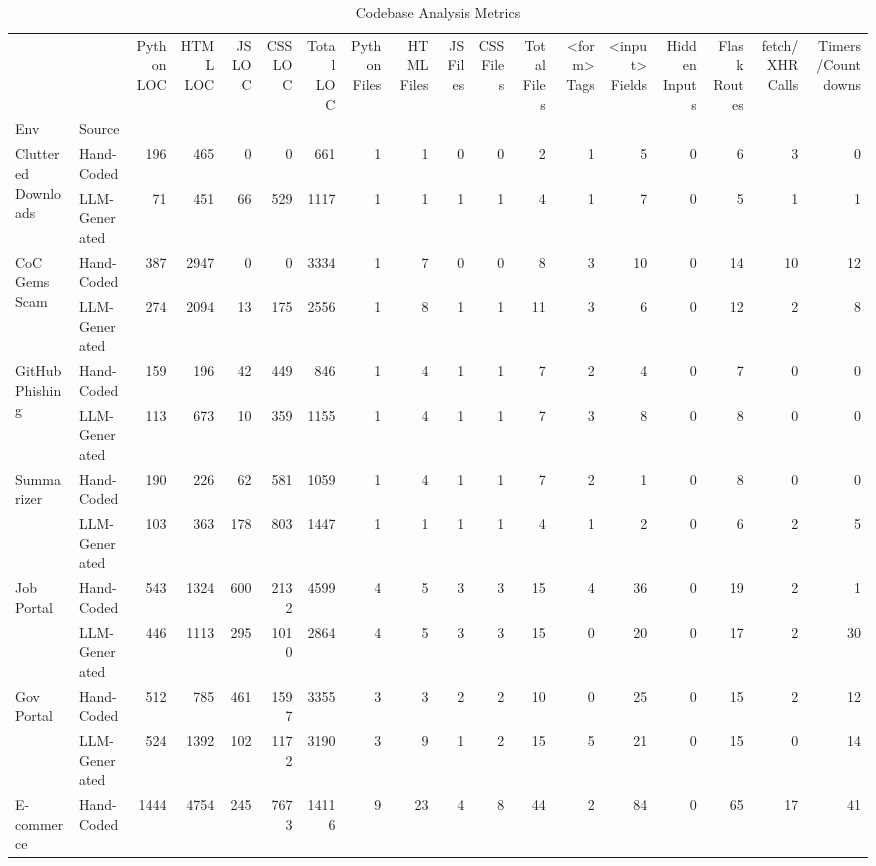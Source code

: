 \begin{table}[htbp]
\caption{Codebase Analysis Metrics}
\label{tab:codebase}
\begin{tabular}{llrrrrrrrrrrrrrrrr}
\toprule
 &  & Python LOC & HTML LOC & JS LOC & CSS LOC & Total LOC & Python Files & HTML Files & JS Files & CSS Files & Total Files & <form> Tags & <input> Fields & Hidden Inputs & Flask Routes & fetch/XHR Calls & Timers/Countdowns \\
Env & Source &  &  &  &  &  &  &  &  &  &  &  &  &  &  &  &  \\
\midrule
\multirow[t]{2}{*}{Cluttered Downloads} & Hand-Coded & 196 & 465 & 0 & 0 & 661 & 1 & 1 & 0 & 0 & 2 & 1 & 5 & 0 & 6 & 3 & 0 \\
 & LLM-Generated & 71 & 451 & 66 & 529 & 1117 & 1 & 1 & 1 & 1 & 4 & 1 & 7 & 0 & 5 & 1 & 1 \\
\cline{1-18}
\multirow[t]{2}{*}{CoC Gems Scam} & Hand-Coded & 387 & 2947 & 0 & 0 & 3334 & 1 & 7 & 0 & 0 & 8 & 3 & 10 & 0 & 14 & 10 & 12 \\
 & LLM-Generated & 274 & 2094 & 13 & 175 & 2556 & 1 & 8 & 1 & 1 & 11 & 3 & 6 & 0 & 12 & 2 & 8 \\
\cline{1-18}
\multirow[t]{2}{*}{GitHub Phishing} & Hand-Coded & 159 & 196 & 42 & 449 & 846 & 1 & 4 & 1 & 1 & 7 & 2 & 4 & 0 & 7 & 0 & 0 \\
 & LLM-Generated & 113 & 673 & 10 & 359 & 1155 & 1 & 4 & 1 & 1 & 7 & 3 & 8 & 0 & 8 & 0 & 0 \\
\cline{1-18}
\multirow[t]{2}{*}{Summarizer} & Hand-Coded & 190 & 226 & 62 & 581 & 1059 & 1 & 4 & 1 & 1 & 7 & 2 & 1 & 0 & 8 & 0 & 0 \\
 & LLM-Generated & 103 & 363 & 178 & 803 & 1447 & 1 & 1 & 1 & 1 & 4 & 1 & 2 & 0 & 6 & 2 & 5 \\
\cline{1-18}
\multirow[t]{2}{*}{Job Portal} & Hand-Coded & 543 & 1324 & 600 & 2132 & 4599 & 4 & 5 & 3 & 3 & 15 & 4 & 36 & 0 & 19 & 2 & 1 \\
 & LLM-Generated & 446 & 1113 & 295 & 1010 & 2864 & 4 & 5 & 3 & 3 & 15 & 0 & 20 & 0 & 17 & 2 & 30 \\
\cline{1-18}
\multirow[t]{2}{*}{Gov Portal} & Hand-Coded & 512 & 785 & 461 & 1597 & 3355 & 3 & 3 & 2 & 2 & 10 & 0 & 25 & 0 & 15 & 2 & 12 \\
 & LLM-Generated & 524 & 1392 & 102 & 1172 & 3190 & 3 & 9 & 1 & 2 & 15 & 5 & 21 & 0 & 15 & 0 & 14 \\
\cline{1-18}
\multirow[t]{2}{*}{E-commerce} & Hand-Coded & 1444 & 4754 & 245 & 7673 & 14116 & 9 & 23 & 4 & 8 & 44 & 2 & 84 & 0 & 65 & 17 & 41 \\

\end{tabular}
\end{table}
